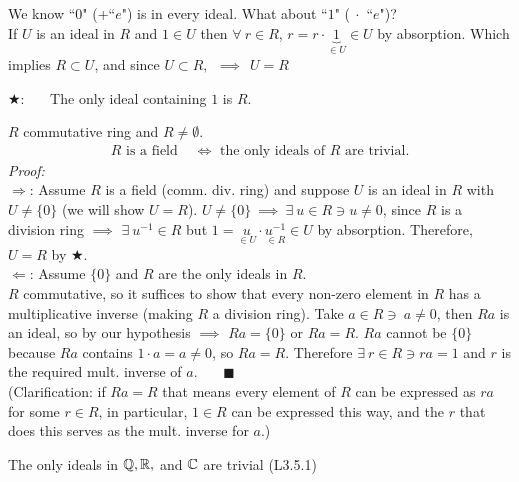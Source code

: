 We know ``$0$" (+``$e$") is in every ideal. What about ``$1$" ($\ \cdot$ ``$e$")? \\ If $U$ is an
ideal in $R$ and $1\in U$ then $\forall \ r \in R$, $r=r\cdot \underbrace{1}_{\in U} \in U$ by
absorption. Which implies $R\subset U$, and since $U\subset R,  \ \ \implies \ \ U=R$ \\
\begin{tcolorbox}[width=5in, center=true]
\begin{center}
$\bigstar$: \ \ \ The only ideal containing $1$ is $R$.
\end{center}
\end{tcolorbox}
\begin{lemma}
    $R$ commutative ring and $R\neq \emptyset$.
    \begin{align}
        R \text{ is a field } &\iff \text{ the only ideals of }R \text{ are trivial.} \nonumber
    \end{align}
    \textit{Proof:}\\
    $\Rightarrow$: Assume $R$ is a field (comm. div. ring) and suppose $U$ is an ideal in $R$ with
    $U\neq \{0\}$ (we will show $U=R$). $U\neq \{0\} \ \implies  \ \exists \ u \in R \ni u\neq 0$,
    since $R$ is a division ring $\implies$ $\exists \ u^{-1}\in R$ but
    $1=\underset{\in U}{u}\cdot \underset{\in R}{u^{-1}}\in U$ by absorption. Therefore, $U=R$ by
    $\bigstar$. \\ \steezybreak
    $\Leftarrow$: Assume $\{0\}$ and $R$ are the only ideals in $R$. \\
    $R$ commutative, so it suffices to show that every non-zero element in $R$ has a multiplicative
    inverse (making $R$ a division ring). Take $a\in R \ni \ a\neq 0$, then $Ra$ is an ideal, so by
    our hypothesis $\implies$ $Ra=\{0\}$ or $Ra=R$. $Ra$ cannot be $\{0\}$ because $Ra$ contains
    $1\cdot a = a \neq 0$, so $Ra=R$. Therefore $\exists \ r \in R \ni ra = 1$ and $r$ is the
    required mult. inverse of $a$. \ \ \ $\blacksquare$ \\

    \noindent (Clarification: if $Ra=R$ that means every element of $R$ can be expressed as $ra$ for
    some $r\in R$, in particular, $1\in R$ can be expressed this way, and the $r$ that does this
    serves as the mult. inverse for $a$.)
\end{lemma}
\begin{example}
    The only ideals in ${\mathbb{Q}}, {\mathbb{R}},$ and ${\mathbb{C}}$ are trivial (L3.5.1)
\end{example}
